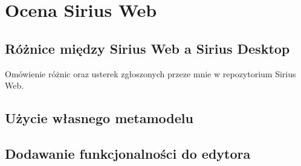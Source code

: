 \chapter{Ocena Sirius Web}

\section{Różnice między Sirius Web a Sirius Desktop}

Omówienie różnic oraz usterek zgłoszonych przeze mnie w repozytorium Sirius
Web.

\section{Użycie własnego metamodelu}

\section{Dodawanie funkcjonalności do edytora}
